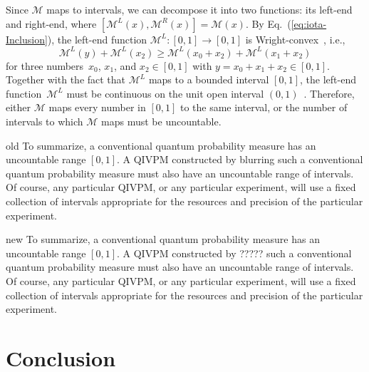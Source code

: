 \documentclass[english,reprint, aps, prl,superscriptaddress, showpacs,
showkeys, longbibliography, amsmath, amssymb, floatfix]{revtex4-1}
\theoremstyle{plain}
\theoremstyle{definition}
\newcommand{\ultramodular}{\mathcal{M}}
\newcommand{\ultramodularL}[1][]{\ensuremath{\ultramodular^{L{#1}}}}
\newcommand{\ultramodularR}[1][]{\ensuremath{\ultramodular^{R{#1}}}}
\newcommand{\says}[3]{\begin{framed}\begin{minipage}{0.9\linewidth}\color{#1}{#2 says: #3}\end{minipage}\end{framed}}
\newcommand{\andy}[1]{\says{blue}{Andy}{#1}}
\newenvironment{compare}{\begin{widetext}\end{widetext}}{\begin{widetext}\end{widetext}}
\newenvironment{oldText}[1]{\begin{compareText}{#1}{old}}{\end{compareText}\newpage}
\newenvironment{newText}[1]{\begin{compareText}{#1}{new}}{\end{compareText}}
\begin{document}
Since $\ultramodular$ maps to intervals, we can decompose it into
two functions: its left-end and right-end, where
 $\left[\ultramodularL\left(x\right),\ultramodularR\left(x\right)\right]=\ultramodular\left(x\right)$.
By Eq.~(\ref{eq:iota-Inclusion}), the left-end function $\ultramodularL:\left[0,1\right]\rightarrow\left[0,1\right]$
is Wright-convex~\cite{Wright1954,RobertsVarberg1973,PecaricTong1992},
i.e., 
\[
\ultramodularL\left(y\right)+\ultramodularL\left(x_{2}\right)\ge\ultramodularL\left(x_{0}+x_{2}\right)+\ultramodularL\left(x_{1}+x_{2}\right)
\]
for three numbers~$x_{0}$, $x_{1}$, and $x_{2}\in\left[0,1\right]$ with
$y=x_{0}+x_{1}+x_{2}\in\left[0,1\right]$. 
Together with the fact that $\ultramodularL$ maps to a bounded
interval $\left[0,1\right]$, the left-end function~$\ultramodularL$
must be continuous on the unit open interval
$\left(0,1\right)$~\cite{MarinacciMontrucchio2005}.  Therefore,
either $\ultramodular$ maps every number in $\left[0,1\right]$ to the
same interval, or the number of intervals to which $\ultramodular$ maps
must be uncountable.

\begin{compare}
\begin{oldText}{\andy}
To summarize, a conventional quantum probability measure has an
uncountable range $[0,1]$. A QIVPM constructed by {\color{blue}blurring} such a
conventional quantum probability measure must also have an uncountable
range of intervals. Of course, any particular QIVPM, or any particular
experiment, will use a fixed collection of intervals appropriate for
the resources and precision of the particular experiment. 
\end{oldText}
\begin{newText}{\andy}
To summarize, a conventional quantum probability measure has an
uncountable range $[0,1]$. A QIVPM constructed by {\color{blue}?????} such a
conventional quantum probability measure must also have an uncountable
range of intervals. Of course, any particular QIVPM, or any particular
experiment, will use a fixed collection of intervals appropriate for
the resources and precision of the particular experiment. 
\end{newText}
\end{compare}

\section{Conclusion}
\label{sec:Conclusion}
  
\end{document}
